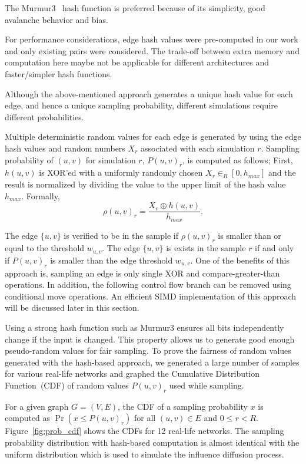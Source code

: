 \documentclass[10pt,journal,compsoc]{IEEEtran}
\begin{document}
The {{\sc Murmur3}}~\cite{MurmurHash3} hash function is preferred because of its simplicity, good avalanche behavior and bias.

For performance considerations, edge hash values were pre-computed in our work and only existing pairs were considered. The trade-off between extra memory and computation here maybe not be applicable for different architectures and faster/simpler hash functions.

Although the above-mentioned approach generates a unique hash value for each edge, and hence a unique sampling probability, different simulations require different probabilities.

Multiple deterministic random values for each edge is generated by using the edge hash values and random numbers $X_r$ associated with each simulation $r$. 
Sampling probability of $(u, v)$ for simulation $r$, $P(u, v)_r$, is computed as follows; First, $h(u,v)$ is XOR'ed with a uniformly randomly chosen $X_r \in_R [0, h_{max}]$ and the result is normalized by dividing the value to the upper limit of the hash value $h_{max}$. Formally,
\begin{equation}
    \label{eq:hash_prob}
    {\rho}(u,v)_r = \frac{X_r \oplus h(u,v)}{h_{max}}.
\end{equation}

The edge $\{u,v\}$ is verified to be in the sample if ${\rho}(u,v)_r$ is smaller than or equal to the threshold $w_{u,v}$. 
The edge $\{u,v\}$ is exists in the sample $r$ if and only if  ${P}(u,v)_r$ is smaller than the edge threshold $w_{u,v}$. One of the benefits of this approach is, sampling an edge is only single XOR and compare-greater-than operations. In addition, the following control flow branch can be removed using conditional move operations. An efficient SIMD implementation of this approach will be discussed later in this section.

Using a strong hash function such as {{\sc Murmur3}} ensures all bits independently change if the input is changed. This property allows us to generate good enough pseudo-random values for fair sampling. To prove the fairness of random values generated with the hash-based approach, we generated a large number of samples for various real-life networks and graphed the Cumulative Distribution Function~(CDF) of random values $P(u,v)_r$ used while sampling.

For a given graph $G = (V,E)$, the CDF of a sampling probability $x$ is computed as $\Pr\left(x \leq P(u,v)_r\right)$ for all $(u,v) \in E$ and $0 \leq r < R$. Figure~\ref{fig:prob_cdf} shows the CDFs for 12 real-life networks. The sampling probability distribution with hash-based computation is almost identical with the uniform distribution which is used to simulate the influence diffusion process.
\end{document}
